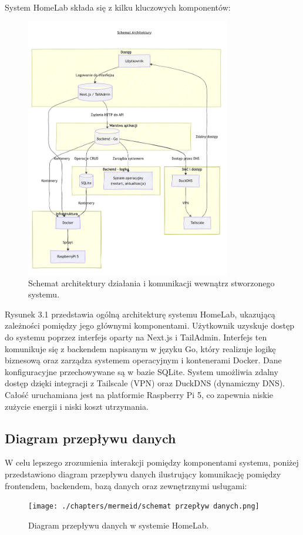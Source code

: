 System HomeLab składa się z kilku kluczowych komponentów:
\begin{figure}[H]
    \centering
    \includegraphics[width=0.8\textwidth]{./chapters/mermeid/schemat_architektury_updated.png}
    \caption{Schemat architektury działania i komunikacji wewnątrz stworzonego systemu.}
    \label{fig:architecture_app}
  \end{figure}
Rysunek 3.1 przedstawia ogólną architekturę systemu HomeLab, ukazującą zależności pomiędzy jego głównymi komponentami. Użytkownik uzyskuje dostęp do systemu poprzez interfejs oparty na Next.js i TailAdmin. Interfejs ten komunikuje się z backendem napisanym w języku Go, który realizuje logikę biznesową oraz zarządza systemem operacyjnym i kontenerami Docker. Dane konfiguracyjne przechowywane są w bazie SQLite. System umożliwia zdalny dostęp dzięki integracji z Tailscale (VPN) oraz DuckDNS (dynamiczny DNS). Całość uruchamiana jest na platformie Raspberry Pi 5, co zapewnia niskie zużycie energii i niski koszt utrzymania.
\subsection{Diagram przepływu danych}
W celu lepszego zrozumienia interakcji pomiędzy komponentami systemu, poniżej przedstawiono diagram przepływu danych ilustrujący komunikację pomiędzy frontendem, backendem, bazą danych oraz zewnętrznymi usługami:
\begin{figure}[H]
    \centering
    \texttt{[image: ./chapters/mermeid/schemat przepływ danych.png]}
    \caption{Diagram przepływu danych w systemie HomeLab.}
    \label{fig:data_flow}
\end{figure}

